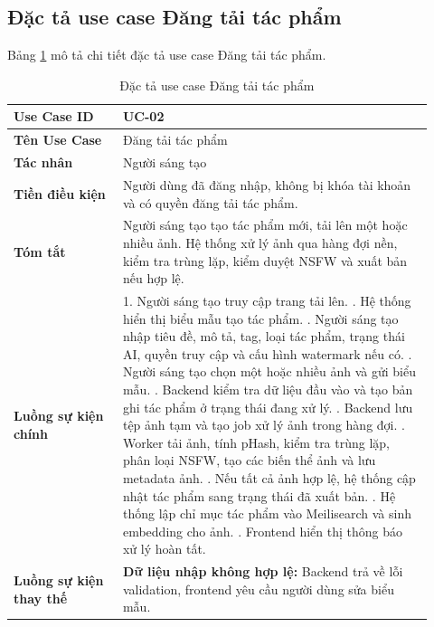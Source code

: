 \subsection{Đặc tả use case Đăng tải tác phẩm}
\label{subsection:2.3.2}

Bảng \ref{table:2_3} mô tả chi tiết đặc tả use case Đăng tải tác phẩm.
\begin{table}[h!]
    \caption{Đặc tả use case Đăng tải tác phẩm}
    \label{table:2_3}
\centering
\small
\renewcommand{\arraystretch}{1.2}
\begin{tabular}{|p{0.24\linewidth}|p{0.68\linewidth}|}
\hline
\textbf{Use Case ID} & UC-02 \\
\hline
\textbf{Tên Use Case} & Đăng tải tác phẩm \\
\hline
\textbf{Tác nhân} & Người sáng tạo \\
\hline
\textbf{Tiền điều kiện} & Người dùng đã đăng nhập, không bị khóa tài khoản và có quyền đăng tải tác phẩm. \\
\hline
\textbf{Tóm tắt} & Người sáng tạo tạo tác phẩm mới, tải lên một hoặc nhiều ảnh. Hệ thống xử lý ảnh qua hàng đợi nền, kiểm tra trùng lặp, kiểm duyệt NSFW và xuất bản nếu hợp lệ. \\
\hline
\textbf{Luồng sự kiện chính} &
1. Người sáng tạo truy cập trang tải lên. \newline
2. Hệ thống hiển thị biểu mẫu tạo tác phẩm. \newline
3. Người sáng tạo nhập tiêu đề, mô tả, tag, loại tác phẩm, trạng thái AI, quyền truy cập và cấu hình watermark nếu có. \newline
4. Người sáng tạo chọn một hoặc nhiều ảnh và gửi biểu mẫu. \newline
5. Backend kiểm tra dữ liệu đầu vào và tạo bản ghi tác phẩm ở trạng thái đang xử lý. \newline
6. Backend lưu tệp ảnh tạm và tạo job xử lý ảnh trong hàng đợi. \newline
7. Worker tải ảnh, tính pHash, kiểm tra trùng lặp, phân loại NSFW, tạo các biến thể ảnh và lưu metadata ảnh. \newline
8. Nếu tất cả ảnh hợp lệ, hệ thống cập nhật tác phẩm sang trạng thái đã xuất bản. \newline
9. Hệ thống lập chỉ mục tác phẩm vào Meilisearch và sinh embedding cho ảnh. \newline
10. Frontend hiển thị thông báo xử lý hoàn tất. \\
\hline
\textbf{Luồng sự kiện thay thế} &
\textbf{Dữ liệu nhập không hợp lệ:} Backend trả về lỗi validation, frontend yêu cầu người dùng sửa biểu mẫu. \newline

\end{tabular}
\end{table}
